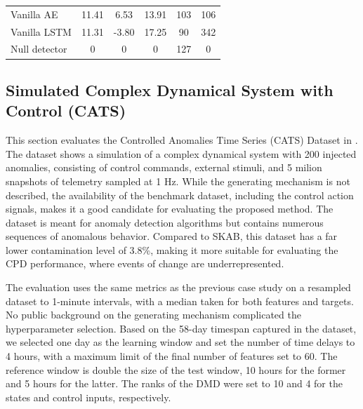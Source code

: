 \begin{table}[H]
\begin{tabular}{l *3{S[table-format=3.2]} *2{S[table-format=3.0]}}
        Vanilla AE               & 11.41          & 6.53           & 13.91          & 103         & 106         \\
        Vanilla LSTM             & 11.31          & -3.80          & 17.25          & 90          & 342         \\
        \midrule
        Null detector            & 0              & 0              & 0              & 127         & 0           \\
        \bottomrule
    \end{tabular}
\end{table}


\subsection{Simulated Complex Dynamical System with Control (CATS)}
This section evaluates the Controlled Anomalies Time Series (CATS) Dataset in \citet{Schmidl2022}. The dataset shows a simulation of a complex dynamical system with 200 injected anomalies, consisting of control commands, external stimuli, and 5 milion snapshots of telemetry sampled at 1 Hz. While the generating mechanism is not described, the availability of the benchmark dataset, including the control action signals, makes it a good candidate for evaluating the proposed method. The dataset is meant for anomaly detection algorithms but contains numerous sequences of anomalous behavior. Compared to SKAB, this dataset has a far lower contamination level of 3.8\%, making it more suitable for evaluating the CPD performance, where events of change are underrepresented.

The evaluation uses the same metrics as the previous case study on a resampled dataset to 1-minute intervals, with a median taken for both features and targets. No public background on the generating mechanism complicated the hyperparameter selection. Based on the 58-day timespan captured in the dataset, we selected one day as the learning window and set the number of time delays to 4 hours, with a maximum limit of the final number of features set to 60. The reference window is double the size of the test window, 10 hours for the former and 5 hours for the latter. The ranks of the DMD were set to 10 and 4 for the states and control inputs, respectively.

